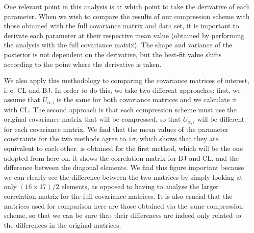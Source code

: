 \documentclass[twocolumn]{\docclass}
\begin{document}
	One relevant point in this analysis is at which point to take the derivative of each parameter. When we wish to compare the results of our compression scheme with those obtained with the full covariance matrix and data set, it is important to derivate each parameter at their respective mean value (obtained by performing the analysis with the full covariance matrix). The shape and variance of the posterior is not dependent on the derivative, but the best-fit value shifts according to the point where the derivative is taken.
	
	We also apply this methodology to comparing the covariance matrices of interest, i. e. CL and BJ. In order to do this, we take two different approaches: first, we assume that $U_{\alpha, i}$ is the same for both covariance matrices and we calculate it with CL. The second approach is that each compression scheme must use the original covariance matrix that will be compressed, so that $U_{\alpha, i}$ will be different for each covariance matrix. We find that the mean values of the parameter constraints for the two methods agree to $1 \sigma$, which shows that they are equivalent to each other.  is obtained for the first method, which will be the one adopted from here on, it shows the correlation matrix for BJ and CL, and the difference between the diagonal elements. We find this figure important because we can clearly see the difference between the two matrices by simply looking at only $(16 \times 17)/2$ elements, as opposed to having to analyse the larger correlation matrix for the full covariance matrices. It is also crucial that the matrices used for comparison here are those obtained via the same compression scheme, so that we can be sure that their differences are indeed only related to the differences in the original matrices.
	
\end{document}
